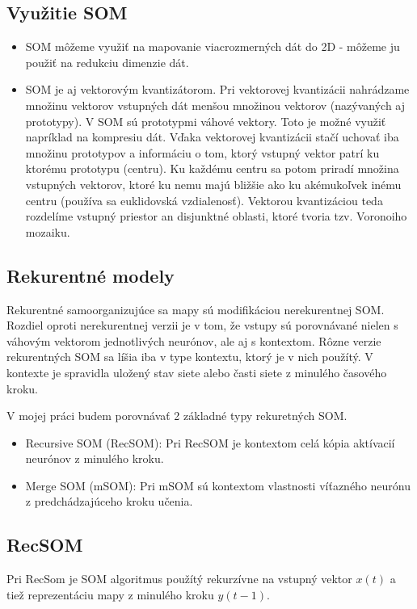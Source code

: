 \subsection{Využitie SOM}
\begin{itemize}
\item SOM môžeme využiť na mapovanie viacrozmerných dát do 2D - môžeme ju použiť na redukciu dimenzie dát.
\item SOM je aj vektorovým kvantizátorom. Pri vektorovej kvantizácii nahrádzame množinu vektorov vstupných dát menšou množinou vektorov (nazývaných aj prototypy). V SOM sú prototypmi
		váhové vektory. Toto je možné využiť napríklad na kompresiu dát. Vďaka vektorovej kvantizácii stačí uchovať iba množinu prototypov a informáciu o tom, ktorý vstupný vektor patrí 
		ku ktorému prototypu (centru). Ku každému centru sa potom priradí množina vstupných vektorov, ktoré ku nemu majú bližšie ako ku akémukoľvek inému centru (používa sa euklidovská vzdialenosť).
		Vektorou kvantizáciou teda rozdelíme vstupný priestor an disjunktné oblasti, ktoré tvoria tzv. Voronoiho mozaiku.
\end{itemize}


\subsection{Rekurentné modely}
Rekurentné samoorganizujúce sa mapy sú modifikáciou nerekurentnej SOM.
Rozdiel oproti nerekurentnej verzii je v tom, že vstupy sú porovnávané
nielen s váhovým vektorom jednotlivých neurónov, ale aj s kontextom.
Rôzne verzie rekurentných SOM sa líšia iba v type kontextu, ktorý je v nich použítý. 
V kontexte je spravidla uložený stav siete alebo časti siete z minulého časového kroku.

V mojej práci budem porovnávať 2 základné typy rekuretných SOM.

\begin{itemize}
	\item Recursive SOM (RecSOM):
	Pri RecSOM je kontextom celá kópia aktívacií neurónov z minulého kroku.
	\item Merge SOM (mSOM):
	Pri mSOM sú kontextom vlastnosti víťazného neurónu z predchádzajúceho kroku učenia.
\end{itemize}

\subsection{RecSOM}
Pri RecSom je SOM algoritmus použítý rekurzívne na vstupný vektor $x(t)$ a tiež reprezentáciu mapy
z minulého kroku $y(t-1)$. \cite{Voegtlin:2002:RSM:776097.776102}

